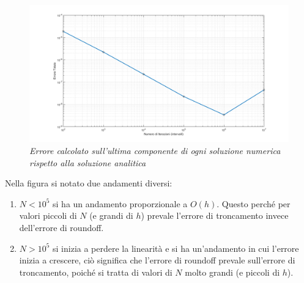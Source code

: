 \begin{figure}[H]
	\centering   
	\includegraphics[width=\textwidth]{matlab/esercizio1_errore_totale.png}
	\caption{\textit{Errore calcolato sull'ultima componente di ogni soluzione numerica rispetto alla soluzione analitica}}
\end{figure}
Nella figura si notato due andamenti diversi:
\begin{enumerate}
	\item $N<10^5$ si ha un andamento proporzionale a $O(h)$. Questo perché per valori piccoli di $N$ (e grandi di $h$) prevale l'errore di troncamento invece dell'errore di roundoff.
	\item $N>10^5$ si inizia a perdere la linearità e si ha un'andamento in cui l'errore inizia a crescere, ciò significa che l'errore di roundoff prevale sull'errore di troncamento, poiché si tratta di valori di $N$ molto grandi (e piccoli di $h$).
\end{enumerate}

